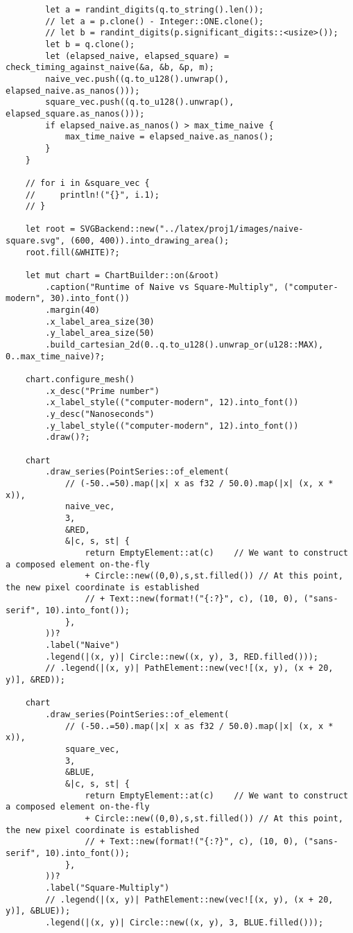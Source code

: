 \begin{verbatim}
        let a = randint_digits(q.to_string().len());
        // let a = p.clone() - Integer::ONE.clone();
        // let b = randint_digits(p.significant_digits::<usize>());
        let b = q.clone();
        let (elapsed_naive, elapsed_square) = check_timing_against_naive(&a, &b, &p, m);
        naive_vec.push((q.to_u128().unwrap(), elapsed_naive.as_nanos()));
        square_vec.push((q.to_u128().unwrap(), elapsed_square.as_nanos()));
        if elapsed_naive.as_nanos() > max_time_naive {
            max_time_naive = elapsed_naive.as_nanos();
        }
    }

    // for i in &square_vec {
    //     println!("{}", i.1);
    // }

    let root = SVGBackend::new("../latex/proj1/images/naive-square.svg", (600, 400)).into_drawing_area();
    root.fill(&WHITE)?;

    let mut chart = ChartBuilder::on(&root)
        .caption("Runtime of Naive vs Square-Multiply", ("computer-modern", 30).into_font())
        .margin(40)
        .x_label_area_size(30)
        .y_label_area_size(50)
        .build_cartesian_2d(0..q.to_u128().unwrap_or(u128::MAX), 0..max_time_naive)?;

    chart.configure_mesh()
        .x_desc("Prime number")
        .x_label_style(("computer-modern", 12).into_font())
        .y_desc("Nanoseconds")
        .y_label_style(("computer-modern", 12).into_font())
        .draw()?;

    chart
        .draw_series(PointSeries::of_element(
            // (-50..=50).map(|x| x as f32 / 50.0).map(|x| (x, x * x)),
            naive_vec,
            3,
            &RED,
            &|c, s, st| {
                return EmptyElement::at(c)    // We want to construct a composed element on-the-fly
                + Circle::new((0,0),s,st.filled()) // At this point, the new pixel coordinate is established
                // + Text::new(format!("{:?}", c), (10, 0), ("sans-serif", 10).into_font());
            },
        ))?
        .label("Naive")
        .legend(|(x, y)| Circle::new((x, y), 3, RED.filled()));
        // .legend(|(x, y)| PathElement::new(vec![(x, y), (x + 20, y)], &RED));

    chart
        .draw_series(PointSeries::of_element(
            // (-50..=50).map(|x| x as f32 / 50.0).map(|x| (x, x * x)),
            square_vec,
            3,
            &BLUE,
            &|c, s, st| {
                return EmptyElement::at(c)    // We want to construct a composed element on-the-fly
                + Circle::new((0,0),s,st.filled()) // At this point, the new pixel coordinate is established
                // + Text::new(format!("{:?}", c), (10, 0), ("sans-serif", 10).into_font());
            },
        ))?
        .label("Square-Multiply")
        // .legend(|(x, y)| PathElement::new(vec![(x, y), (x + 20, y)], &BLUE));
        .legend(|(x, y)| Circle::new((x, y), 3, BLUE.filled()));


\end{verbatim}
